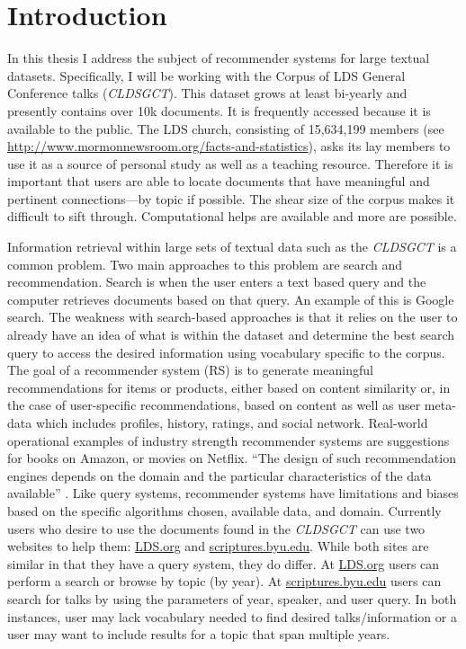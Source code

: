 \chapter{Introduction} \label{chp:introduction}

In this thesis I address the subject of recommender systems for large textual datasets. Specifically, I will be working with the Corpus of LDS General Conference talks (\textit{CLDSGCT}). This dataset grows at least bi-yearly and presently contains over 10k documents. It is frequently accessed because it is available to the public. The LDS church, consisting of 15,634,199 members (see \url{http://www.mormonnewsroom.org/facts-and-statistics}), asks its lay members to use it as a source of personal study as well as a teaching resource.  Therefore it is important that users are able to locate documents that have meaningful and pertinent connections---by topic if possible. The shear size of the corpus makes it difficult to sift through. Computational helps are available and more are possible.

Information retrieval within large sets of textual data such as the \textit{CLDSGCT} is a common problem. Two main approaches to this problem are search and recommendation. Search is when the user enters a text based query and the computer retrieves documents based on that query. An example of this is Google search. The weakness with search-based approaches is that it relies on the user to already have an idea of what is within the dataset and determine the best search query to access the desired information using vocabulary specific to the corpus. The goal of a recommender system (RS) is to generate meaningful recommendations for items or products, either based on content similarity or, in the case of user-specific recommendations, based on content as well as user meta-data which includes profiles, history, ratings, and social network. Real-world operational examples of industry strength recommender systems are suggestions for books on Amazon, or movies on Netflix. ``The design of such recommendation engines depends on the domain and the particular characteristics of the data available'' \citep{Melville2010}. Like query systems, recommender systems have limitations and biases based on the specific algorithms chosen, available data, and domain. Currently users who desire to use the documents found in the \textit{CLDSGCT} can use two websites to help them: \url{LDS.org} and \url{scriptures.byu.edu}. While both sites are similar in that they have a query system, they do differ. At \url{LDS.org} users can perform a search or browse by topic (by year). At \url{scriptures.byu.edu} users can search for talks by using the parameters of year, speaker, and user query. In both instances, user may lack vocabulary needed to find desired talks/information or a user may want to include results for a topic that span multiple years. %

